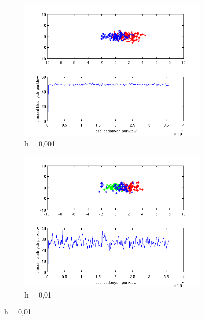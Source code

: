 \documentclass[10pt,a4paper]{article}
\begin{document}
\begin{figure}[H]

   \begin{subfigure}[b]{0.5\textwidth}
    \includegraphics[width=\textwidth]{test_h0_001.png}
    \caption{h = 0,001}
  \end{subfigure}
  \hfill
  \begin{subfigure}[b]{0.5\textwidth}
    \includegraphics[width=\textwidth]{test_h0_01.png}
    \caption{h = 0,01}
  \end{subfigure}
  

\end{figure}
\end{document}
